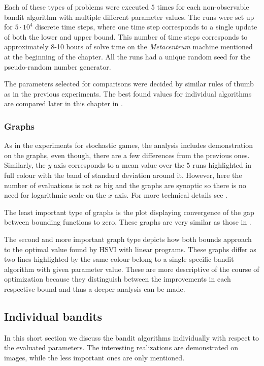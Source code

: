 \documentclass[../main.tex]{subfiles}
\begin{document}
Each of these types of problems were executed $5$ times for each non-observable bandit algorithm with multiple different parameter values.
The runs were set up for $5 \cdot 10^4$ discrete time steps, where one time step corresponds to a single update of both the lower and upper bound.
This number of time steps corresponds to approximately 8-10 hours of solve time on the \textit{Metacentrum} machine mentioned at the beginning of the chapter.
All the runs had a unique random seed for the pseudo-random number generator.

The parameters selected for comparisons were decided by similar rules of thumb as in the previous experiments.
The best found values for individual algorithms are compared later in this chapter in .

\subsubsection{Graphs}\label{exp:osposg:env:graphs}
As in the experiments for stochastic games, the analysis includes demonstration on the graphs, even though, there are a few differences from the previous ones.
Similarly, the $y$ axis corresponds to a mean value over the $5$ runs highlighted in full colour with the band of standard deviation around it.
However, here the number of evaluations is not as big and the graphs are synoptic so there is no need for logarithmic scale on the $x$ axis.
For more technical details see .

The least important type of graphs is the plot displaying convergence of the gap between bounding functions to zero.
These graphs are very similar as those in .

The second and more important graph type depicts how both bounds approach to the optimal value found by HSVI with linear programs.
These graphs differ as two lines highlighted by the same colour belong to a single specific bandit algorithm with given parameter value.
These are more descriptive of the course of optimization because they distinguish between the improvements in each respective bound and thus a deeper analysis can be made.

\subsection{Individual bandits}\label{exp:osposg:individual}
In this short section we discuss the bandit algorithms individually with respect to the evaluated parameters.
The interesting realizations are demonstrated on images, while the less important ones are only mentioned.
\end{document}

